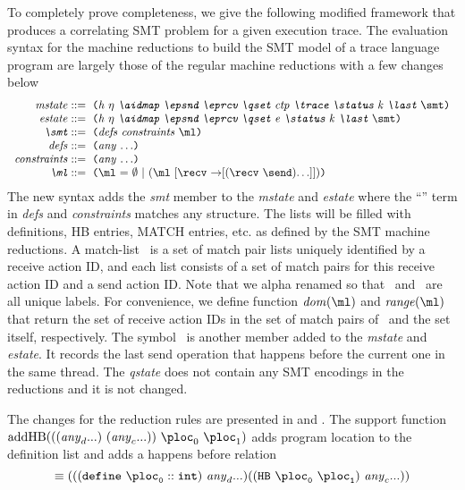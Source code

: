 To completely prove completeness, we give the following modified framework that produces a correlating SMT problem for a given execution trace. The evaluation syntax for the machine reductions to build the SMT
model of a trace language program are largely those of the regular machine
reductions with a few changes below
\[
\cfgstart
\cfgrule{mstate}{\lp\cfgnt{h}\ \cfgnt{\ensuremath{\eta}}\ \cfgnt{\aidmap}\
  \cfgnt{\epsnd}\ \cfgnt{\eprcv}\ \cfgnt{\qset}\ \cfgnt{ctp}\ \cfgnt{\trace}\ \cfgnt{\status}\ \cfgnt{k}\ \cfgnt{\last}\ \smt\rp}
\cfgrule{estate}{\lp\cfgnt{h}\ \cfgnt{\ensuremath{\eta}}\ \cfgnt{\aidmap}\
  \cfgnt{\epsnd}\ \cfgnt{\eprcv}\ \cfgnt{\qset}\ \cfgnt{e}\ \cfgnt{\status}\ \cfgnt{k}\ \cfgnt{\last}\ \smt\rp}
\cfgrule{\smt}{\lp\cfgnt{defs}~\cfgnt{constraints}~\ml\rp}
\cfgrule{defs}{\lp\cfgnt{any}~$\ldots$\rp}
\cfgrule{constraints}{\lp\cfgnt{any}~$\ldots$\rp}
\cfgrule{\ml}{\lp\ml~=~$\emptyset$~$|$~(\ml~[\recv~$\rightarrow$[(\recv~\send)$\ldots$]])\rp}
\cfgend
\]
The new syntax adds the \textit{smt} member to the \textit{mstate}
and \textit{estate} where the ``'' term in \textit{defs}
and \textit{constraints} matches any structure. The lists will
be filled with definitions, HB entries, MATCH entries, etc. as defined by the SMT machine reductions. A match-list \ml\ is a set of match pair lists uniquely identified by a receive action ID, and each list consists of a set of match pairs for this receive action ID and a send action ID. Note that we alpha renamed so that \recv\ and \send\ are all unique labels. For convenience, we define function $\mathit{dom(\ml)}$ and $\mathit{range(\ml)}$ that return the set of receive action IDs in the set of match pairs of \ml\ and the set itself, respectively. The symbol \last\ is another member added to the \textit{mstate} and \textit{estate}. It records the last send operation that happens before the current one in the same thread. The \textit{qstate} does not contain any SMT encodings in the reductions and it is not changed.

The changes for the reduction rules are presented in \figref{fig:machine_smt} and \figref{fig:expression_smt}. The support function $\mathrm{addHB}(((\mathit{any}_d ...)\ (\mathit{any}_c ...))\ \ploc_0\ \ploc_1)$ adds program location to the definition list and adds a happens before relation
\[
 \equiv \\
   (((\mathtt{define\ \ploc_0 :: int})\ \mathit{any}_d ...)((\mathtt{HB\ \ploc_0\ \ploc_1})\ \mathit{any}_c ...))
\]


